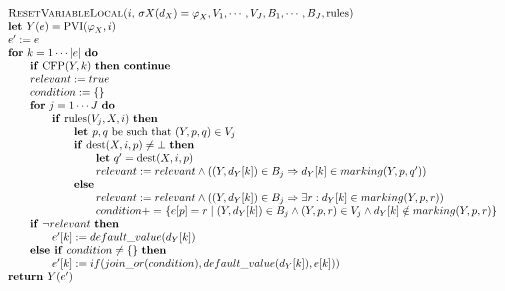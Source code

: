 \begin{equation*}
\begin{tabular}{l}
\textsc{ResetVariableLocal(}$i,$ $\sigma X(d_{X})=\varphi _{X},V_{1},\cdots
,V_{J},B_{1},\cdots ,B_{J},\mathrm{rules}$\textsc{)} \\ 
\textbf{let }$Y(e)=\mathrm{PVI}(\varphi _{X},i)$ \\ 
$e^{\prime }:=e$ \\ 
\textbf{for} $k=1\cdots \left\vert e\right\vert $ \textbf{do} \\ 
$\qquad $\textbf{if} $\mathrm{CFP}(Y,k)$ \textbf{then continue} \\ 
$\qquad relevant:=true$ \\ 
$\qquad condition:=\{\}$ \\ 
$\qquad $\textbf{for} $j=1\cdots J$ \textbf{do} \\ 
$\qquad \qquad $\textbf{if} $\mathrm{rules}(V_{j},X,i)$ \textbf{then} \\ 
$\qquad \qquad \qquad $\textbf{let }$p,q$ be such that $(Y,p,q)\in V_{j}$ \\ 
$\qquad \qquad \qquad $\textbf{if} $\mathrm{dest}(X,i,p)\neq \bot $ \textbf{%
then} \\ 
$\qquad \qquad \qquad \qquad $\textbf{let} $q^{\prime }=\mathrm{dest}(X,i,p)$
\\ 
$\qquad \qquad \qquad \qquad relevant:=relevant\wedge \left( \left(
Y,d_{Y}[k]\right) \in B_{j}\Rightarrow d_{Y}[k]\in marking(Y,p,q^{\prime
})\right) $ \\ 
$\qquad \qquad \qquad $\textbf{else} \\ 
$\qquad \qquad \qquad \qquad relevant:=relevant\wedge (\left(
Y,d_{Y}[k]\right) \in B_{j}\Rightarrow \exists r:d_{Y}[k]\in marking(Y,p,r))$
\\ 
$\qquad \qquad \qquad \qquad condition+=$ $\{e[p]=r\mid \left(
Y,d_{Y}[k]\right) \in B_{j}\wedge (Y,p,r)\in V_{j}\wedge d_{Y}[k]\notin
marking(Y,p,r)\}$ \\ 
$\qquad $\textbf{if} $\lnot relevant$ \textbf{then} \\ 
$\qquad \qquad e^{\prime }[k]:=default\_value(d_{Y}[k])$ \\ 
$\qquad $\textbf{else if} $condition\neq \{\}$ \textbf{then} \\ 
$\qquad \qquad e^{\prime
}[k]:=if(join\_or(condition),default\_value(d_{Y}[k]),e[k]))$ \\ 
\textbf{return }$Y(e^{\prime })$%
\end{tabular}%
\end{equation*}%
\newpage 
